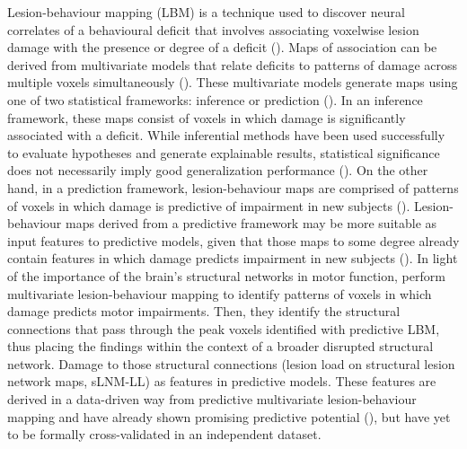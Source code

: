 \documentclass[10pt]{article}
\begin{document}
Lesion-behaviour mapping (LBM) is a technique used to discover neural correlates of a behavioural deficit that involves associating voxelwise lesion damage with the presence or degree of a deficit (\cite{Bates2003-eg,Karnath2020-cg}). Maps of association can be derived from multivariate models that relate deficits to patterns of damage across multiple voxels simultaneously (\cite{Pustina2018-xv, Zhang2014-jd}). These multivariate models generate maps using one of two statistical frameworks: inference or prediction (\cite{Bzdok2020-py, Sperber2022-oj}). In an inference framework, these maps consist of voxels in which damage is significantly associated with a deficit. While inferential methods have been used successfully to evaluate hypotheses and generate explainable results, statistical significance does not necessarily imply good generalization performance (\cite{Bzdok2020-py}). On the other hand, in a prediction framework, lesion-behaviour maps are comprised of patterns of voxels in which damage is predictive of impairment in new subjects (\cite{Bowren2022-rs, Mah2014-cb,Rondina2017-ij, Sperber2020-kp}). Lesion-behaviour maps derived from a predictive framework may be more suitable as input features to predictive models, given that those maps to some degree already contain features in which damage predicts impairment in new subjects (\cite{Zhang2014-jd}). In light of the importance of the brain's structural networks in motor function, \cite{Bowren2022-rs} perform multivariate lesion-behaviour mapping to identify patterns of voxels in which damage predicts motor impairments. Then, they identify the structural connections that pass through the peak voxels identified with predictive LBM, thus placing the findings within the context of a broader disrupted structural network. Damage to those structural connections (lesion load on structural lesion network maps, sLNM-LL) as features in predictive models. These features are derived in a data-driven way from predictive multivariate lesion-behaviour mapping and have already shown promising predictive potential (\cite{Bowren2022-rs}), but have yet to be formally cross-validated in an independent dataset. 
\end{document}
